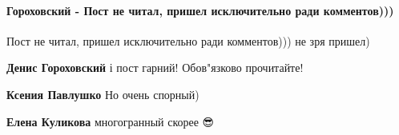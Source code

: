  
 
 
 
 
\paragraph{Гороховский - Пост не читал, пришел исключительно ради комментов)))}

\begin{itemize}
 
Пост не читал, пришел исключительно ради комментов))) не зря пришел)

\begin{itemize}
 
\textbf{Денис Гороховский} і пост гарний! Обов"язково прочитайте!

 
\textbf{Ксения Павлушко} Но очень спорный)

 
\textbf{Елена Куликова} многогранный скорее 😎

 

\end{itemize}
\end{itemize}
